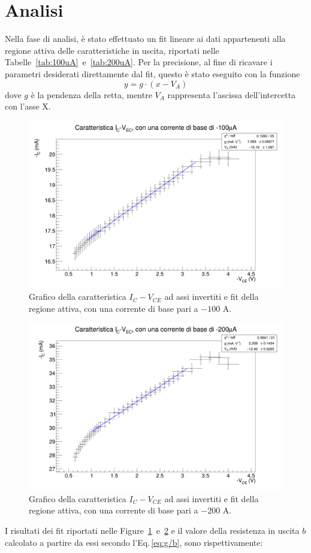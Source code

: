 \documentclass[../main.tex]{subfiles}
\begin{document}
    \section{Analisi}\label{sec:analisi}
%    
        Nella fase di analisi, è stato effettuato un fit lineare ai dati
        appartenenti alla regione attiva delle caratteristiche in
        uscita, riportati nelle
        Tabelle~\ref{tab:100uA}~e~\ref{tab:200uA}.
        Per la precisione, al fine di ricavare i parametri
        desiderati direttamente dal fit, questo è stato eseguito
        con la funzione
        \begin{equation*}
            y = g \cdot ( x - V_A)
        \end{equation*}
        dove $g$ è la pendenza della retta, mentre $V_A$ rappresenta
        l'ascissa dell'intercetta con l'asse X.

        \begin{figure}[h!]
            \centering
            \includegraphics[width=.69\textwidth]{../../images/caratteristica-100uA}
            \caption{
                Grafico della caratteristica $I_C - V_{CE}$ ad assi
                invertiti e fit della regione attiva, con una
                corrente di base pari a $-100$ \textmu A.
            }
            \label{fig:fit-100}
        \end{figure}
        \begin{figure}[h!]
            \centering
            \includegraphics[width=.69\textwidth]{../../images/caratteristica-200uA}
            \caption{
                Grafico della caratteristica $I_C - V_{CE}$ ad assi
                invertiti e fit della regione attiva, con una
                corrente di base pari a $-200$ \textmu A.
            }
            \label{fig:fit-200}
        \end{figure}
        I risultati dei fit riportati nelle
        Figure~\ref{fig:fit-100}~e~\ref{fig:fit-200} e il valore
        della resistenza in uscita $b$ calcolato a partire da essi secondo
        l'Eq.\,\eqref{eq:g/b}, sono rispettivamente:
\end{document}

